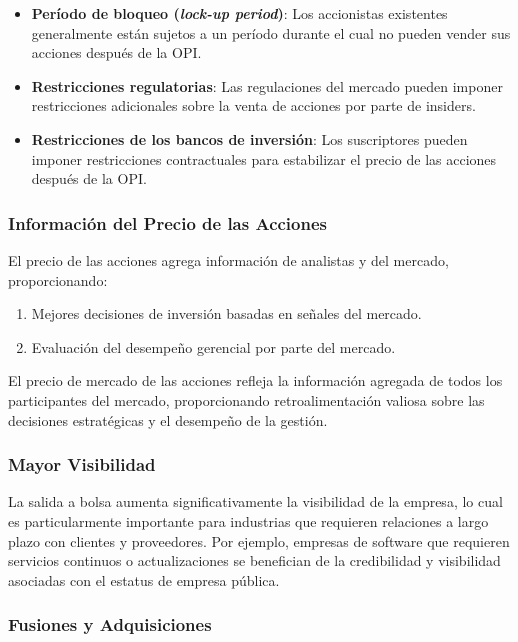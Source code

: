 \begin{itemize}
\item \textbf{Período de bloqueo (\textit{lock-up period})}: Los accionistas existentes generalmente están sujetos a un período durante el cual no pueden vender sus acciones después de la OPI.
\item \textbf{Restricciones regulatorias}: Las regulaciones del mercado pueden imponer restricciones adicionales sobre la venta de acciones por parte de insiders.
\item \textbf{Restricciones de los bancos de inversión}: Los suscriptores pueden imponer restricciones contractuales para estabilizar el precio de las acciones después de la OPI.
\end{itemize}

\subsubsection{Información del Precio de las Acciones}

\begin{proposicion}
El precio de las acciones agrega información de analistas y del mercado, proporcionando:
\begin{enumerate}
\item Mejores decisiones de inversión basadas en señales del mercado.
\item Evaluación del desempeño gerencial por parte del mercado.
\end{enumerate}
\end{proposicion}

El precio de mercado de las acciones refleja la información agregada de todos los participantes del mercado, proporcionando retroalimentación valiosa sobre las decisiones estratégicas y el desempeño de la gestión.

\subsubsection{Mayor Visibilidad}

La salida a bolsa aumenta significativamente la visibilidad de la empresa, lo cual es particularmente importante para industrias que requieren relaciones a largo plazo con clientes y proveedores. Por ejemplo, empresas de software que requieren servicios continuos o actualizaciones se benefician de la credibilidad y visibilidad asociadas con el estatus de empresa pública.

\subsubsection{Fusiones y Adquisiciones}

